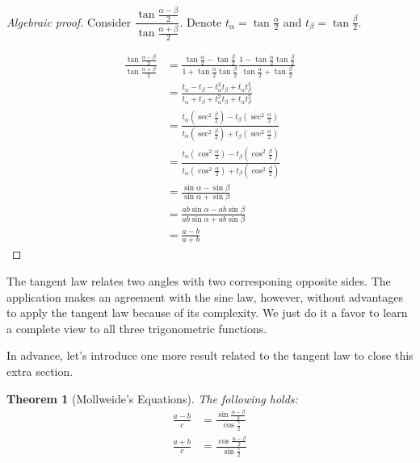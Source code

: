 \documentclass[12pt]{article}
\newtheorem*{theorem}{Theorem}
\begin{document}
    \begin{proof}[Algebraic proof]
        Consider $\dfrac{\tan{\frac{\alpha-\beta}{2}}}{\tan{\frac{\alpha+\beta}{2}}}$. Denote $t_\alpha = \tan{\frac{\alpha}{2}}$ and $t_\beta = \tan{\frac{\beta}{2}}$.

        \begin{align*}
            \frac{\tan{\frac{\alpha-\beta}{2}}}{\tan{\frac{\alpha+\beta}{2}}}&=\frac{\tan{\frac{\alpha}{2}}-\tan{\frac{\beta}{2}}}{1+\tan{\frac{\alpha}{2}}\tan{\frac{\beta}{2}}}\frac{1-\tan{\frac{\alpha}{2}}\tan{\frac{\beta}{2}}}{\tan{\frac{\alpha}{2}}+\tan{\frac{\beta}{2}}}\\
            &=\frac{t_\alpha - t_\beta - t_\alpha^2t_\beta+t_\alpha t_\beta^2}{t_\alpha + t_\beta + t_\alpha^2t_\beta+t_\alpha t_\beta^2}\\
            &=\frac{t_\alpha(\sec^2{\frac{\beta}{2}})-t_\beta(\sec^2{\frac{\alpha}{2}})}{t_\alpha(\sec^2{\frac{\beta}{2}})+t_\beta(\sec^2{\frac{\alpha}{2}})}\\
            &=\frac{t_\alpha(\cos^2{\frac{\alpha}{2}})-t_\beta(\cos^2{\frac{\beta}{2}})}{t_\alpha(\cos^2{\frac{\alpha}{2}})+t_\beta(\cos^2{\frac{\beta}{2}})}\\
            &=\frac{\sin{\alpha}-\sin{\beta}}{\sin{\alpha}+\sin{\beta}}\\
            &=\frac{ab\sin{\alpha}-ab\sin{\beta}}{ab\sin{\alpha}+ab\sin{\beta}}\\
            &=\frac{a-b}{a+b}
        \end{align*}
    \end{proof}

    The tangent law relates two angles with two corresponing opposite sides. The application makes an agreement with the sine law, however, without advantages to apply the tangent law because of its complexity. We just do it a favor to learn a complete view to all three trigonometric functions.

    In advance, let's introduce one more result related to the tangent law to close this extra section.

    \begin{theorem}[Mollweide's Equations]
        The following holds:\begin{align}
            \frac{a-b}{c}&=\frac{\sin{\frac{\alpha-\beta}{2}}}{\cos{\frac{\gamma}{2}}}\\
            \frac{a+b}{c}&=\frac{\cos{\frac{\alpha-\beta}{2}}}{\sin{\frac{\gamma}{2}}}
        \end{align}
    \end{theorem}
\end{document}
